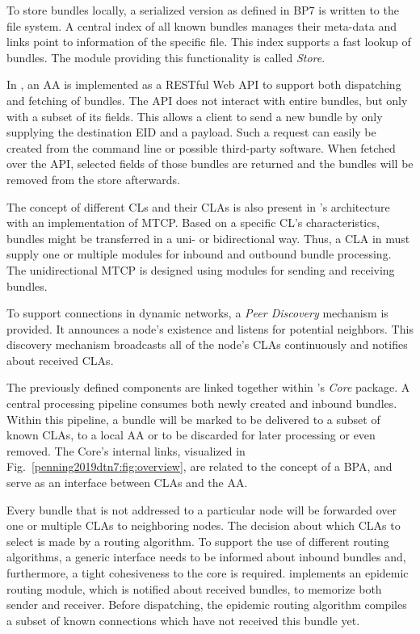 To store bundles locally, a serialized version as defined in BP7 is written to the file system. 
A central index of all known bundles manages their meta-data and links point to information of the specific file.
This index supports a fast lookup of bundles. The module providing this functionality is called \textit{Store}.

In \dtn, an AA is implemented as a RESTful Web API to support both dispatching and fetching of bundles. 
The API does not interact with entire bundles, but only with a subset of its fields.
This allows a client to send a new bundle by only supplying the destination EID and a payload. 
Such a request can easily be created from the command line or possible third-party software.
When fetched over the API, selected fields of those bundles are returned and the bundles will be removed from the store afterwards.

The concept of different CLs and their CLAs is also present in \dtn's architecture with an implementation of MTCP.
Based on a specific CL's characteristics, bundles might be transferred in a uni- or bidirectional way. Thus, a CLA in \dtn must supply one or multiple modules for inbound and outbound bundle processing.
The unidirectional MTCP is designed using modules for sending and receiving bundles.

To support connections in dynamic networks, a \textit{Peer Discovery} mechanism is provided. It announces a node's existence and listens for potential neighbors.
This discovery mechanism broadcasts all of the node's CLAs continuously and notifies about received CLAs.

The previously defined components are linked together within \dtn's \textit{Core} package. 
A central processing pipeline consumes both newly created and inbound bundles. 
Within this pipeline, a bundle will be marked to be delivered to a subset of known CLAs, to a local AA or to be discarded for later processing or even removed.
The Core's internal links, visualized in Fig.~\ref{penning2019dtn7:fig:overview}, are related to the concept of a BPA, and serve as an interface between CLAs and the AA.

Every bundle that is not addressed to a particular node will be forwarded over one or multiple CLAs to neighboring nodes.
The decision about which CLAs to select is made by a routing algorithm.
To support the use of different routing algorithms, a generic interface needs to be informed about inbound bundles and, furthermore, a tight cohesiveness to the core is required.
\dtn implements an epidemic routing module, which is notified about received bundles, to memorize both sender and receiver.
Before dispatching, the epidemic routing algorithm compiles a subset of known connections which have not received this bundle yet.

